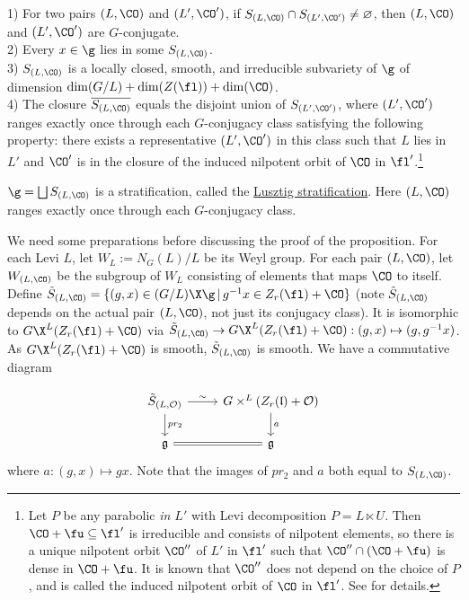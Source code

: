 \begin{proposition}\label{prop_lusztigstrat}
    1) For two pairs $(L,\CO)$ and $(L',\CO')$, if $S_{(L,\CO)}\cap S_{(L',\CO')}\neq\varnothing$, then  $(L,\CO)$ and $(L',\CO')$ are $G$-conjugate.\\
    2) Every $x\in\g$ lies in some $S_{(L,\CO)}$.\\
    3) $S_{(L,\CO)}$ is a locally closed, smooth, and irreducible subvariety of $\g$ of dimension $\mathrm{dim}(G/L)+\mathrm{dim}(Z(\fl))+\mathrm{dim}(\CO)$.\\
    4) The closure $\overline{S_{(L,\CO)}}$ equals the disjoint union of $S_{(L',\CO')}$, where $(L',\CO')$ ranges exactly once through each $G$-conjugacy class satisfying the following property: there exists a representative $(L',\CO')$ in this class such that $L$ lies in $L'$ and $\CO'$ is in the closure of the induced nilpotent orbit of $\CO$ in $\fl'$.\footnote{Let $P$ be any parabolic \textit{in $L'$} with Levi decomposition $P=L\ltimes U$. Then $\CO+\fu\subseteq \fl'$ is irreducible and consists of nilpotent elements, so there is a unique nilpotent orbit $\CO''$ of $L'$ in $\fl'$ such that $\CO''\cap(\CO+\fu)$ is dense in $\CO+\fu$. It is known that $\CO''$ does not depend on the choice of $P$, and is called the induced nilpotent orbit of $\CO$ in $\fl'$. See \cite{lusztig_induced_1979} for details.}
\end{proposition}

\begin{corollary}
    $\g=\bigsqcup S_{(L,\CO)}$ is a stratification, called the \underline{Lusztig stratification}. Here $(L,\CO)$ ranges exactly once through each $G$-conjugacy class.
\end{corollary}

We need some preparations before discussing the proof of the proposition. For each Levi $L$, let $W_L:=N_G(L)/L$ be its Weyl group. For each pair $(L,\CO)$, let $W_{(L,\CO)}$ be the subgroup of $W_L$ consisting of elements that maps $\CO$ to itself. Define $\Tilde{S}_{(L,\CO)}=\{(g,x)\in (G/L)\X \g\,|\, g^{-1}x\in Z_r(\fl)+\CO\}$ (note $\Tilde{S}_{(L,\CO)}$ depends on the actual pair $(L,\CO)$, not just its conjugacy class). It is isomorphic to $G\X^L(Z_r(\fl)+\CO)$ via $\Tilde{S}_{(L,\CO)}\rightarrow G\X^L(Z_r(\fl)+\CO): (g,x)\mapsto(g,g^{-1}x)$. As $G\X^L(Z_r(\fl)+\CO)$ is smooth, $\Tilde{S}_{(L,\CO)}$ is smooth. We have a commutative diagram 

\[\begin{tikzcd}
	{\tilde{S}_{(L,\mathcal{O})}} & {G\times^L(Z_r(\mathfrak{l})+\mathcal{O})} \\
	{\mathfrak{g}} & {\mathfrak{g}}
	\arrow["{pr_2}", from=1-1, to=2-1]
	\arrow["\sim", from=1-1, to=1-2]
	\arrow["a", from=1-2, to=2-2]
	\arrow[Rightarrow, no head, from=2-1, to=2-2]
\end{tikzcd}\]
where $a: (g,x)\mapsto gx$. Note that the images of $pr_2$ and $a$ both equal to $S_{(L,\CO)}$.\\

